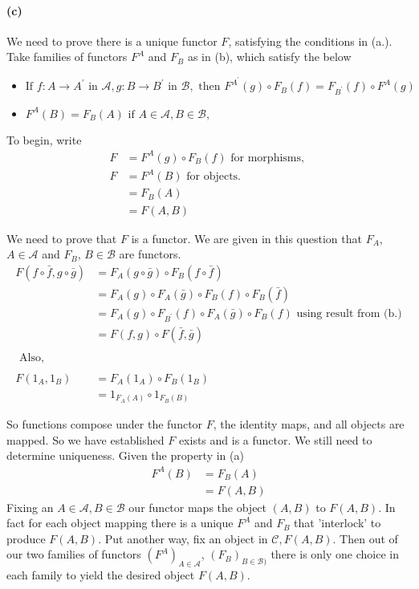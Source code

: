 \documentclass{article}
\begin{document}
\paragraph{(c)}

We need to prove there is a unique functor $F$, satisfying the conditions in (a.). Take families of functors $F^A$ and $F_B$ as in (b), which satisfy the below

\begin{itemize}
\item $ \text{If }f\colon A \rightarrow A^{\prime} \text{ in } \mathcal{A}, g\colon B \rightarrow B^{\prime} \text{ in } \mathcal{B}, \text{ then } F^{A^{\prime}}(g) \circ F_B(f) = F_{B^\prime}(f) \circ F^A(g)$
\item $F^A(B) = F_B(A) \text{ if } A \in \mathcal{A}, B \in \mathcal{B},$
\end{itemize}

To begin, write
\begin{align*}
  F &= F^A(g) \circ F_B(f) \text{ for morphisms, } \\
  F & =F^A(B) \text{ for objects. } \\
    & =F_B(A) \\
    & = F(A,B)
\end{align*}

We need to prove that $F$ is a functor. We are given in this question that $F_A$, $A \in \mathcal{A}$ and $F_B$, $B \in \mathcal{B}$ are functors.
\begin{align*}
  F(f \circ \bar{f}, g \circ \bar{g}) &= F_A(g \circ \bar{g}) \circ F_B(f \circ \bar{f}) \\
                                                &= F_A(g) \circ F_A(\bar{g}) \circ F_B(f) \circ F_B(\bar{f}) \\
                                                &= F_A(g) \circ F_{B^{\prime}}(f) \circ F_A(\bar{g}) \circ F_B(f) \text{ using result from (b.)} \\
                                      &= F(f,g) \circ F(\bar{f}, \bar{g}) \\ \\
  \text { Also, } \\\\
  F(1_A,1_B) &= F_A(1_A) \circ F_B(1_B) \\
             &= 1_{F_A(A)} \circ 1_{F_B(B)}
\end{align*}

So functions compose under the functor $F$, the identity maps, and all objects are mapped. So we have established $F$ exists and is a functor. We still need to determine uniqueness. Given the property in (a)
\begin{align*}
  F^A(B) &= F_B(A) \\
         &= F(A,B)
\end{align*}
Fixing an $A \in \mathcal{A}, B \in \mathcal{B}$ our functor maps the object $(A,B)$ to $F(A,B)$. In fact for each object mapping there is a unique $F^A$ and $F_B$ that 'interlock' to produce $F(A,B)$. Put another way, fix an object in $\mathcal{C}, F(A,B)$. Then out of our two families of functors $(F^A)_{A\in\mathcal{A}}$, $(F_B)_{B\in\mathcal{B})}$ there is only one choice in each family to yield the desired object $F(A,B)$.
\end{document}
